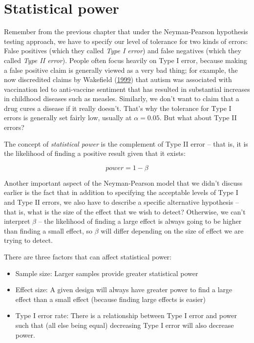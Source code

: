 \documentclass[
  12pt,
]{book}
\providecommand{\tightlist}{%
  \setlength{\itemsep}{0pt}\setlength{\parskip}{0pt}}
\begin{document}
\hypertarget{statistical-power}{%
\section{Statistical power}\label{statistical-power}}

Remember from the previous chapter that under the Neyman-Pearson hypothesis testing approach, we have to specify our level of tolerance for two kinds of errors: False positives (which they called \emph{Type I error}) and false negatives (which they called \emph{Type II error}). People often focus heavily on Type I error, because making a false positive claim is generally viewed as a very bad thing; for example, the now discredited claims by Wakefield (\protect\hyperlink{ref-wake:1999}{1999}) that autism was associated with vaccination led to anti-vaccine sentiment that has resulted in substantial increases in childhood diseases such as measles. Similarly, we don't want to claim that a drug cures a disease if it really doesn't. That's why the tolerance for Type I errors is generally set fairly low, usually at \(\alpha = 0.05\). But what about Type II errors?

The concept of \emph{statistical power} is the complement of Type II error -- that is, it is the likelihood of finding a positive result given that it exists:

\[ 
power = 1 - \beta
\]

Another important aspect of the Neyman-Pearson model that we didn't discuss earlier is the fact that in addition to specifying the acceptable levels of Type I and Type II errors, we also have to describe a specific alternative hypothesis -- that is, what is the size of the effect that we wish to detect? Otherwise, we can't interpret \(\beta\) -- the likelihood of finding a large effect is always going to be higher than finding a small effect, so \(\beta\) will differ depending on the size of effect we are trying to detect.

There are three factors that can affect statistical power:

\begin{itemize}
\tightlist
\item
  Sample size: Larger samples provide greater statistical power
\item
  Effect size: A given design will always have greater power to find a large effect than a small effect (because finding large effects is easier)
\item
  Type I error rate: There is a relationship between Type I error and power such that (all else being equal) decreasing Type I error will also decrease power.
\end{itemize}
\end{document}
